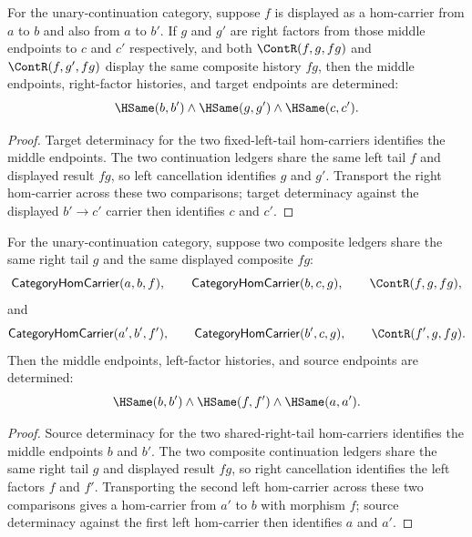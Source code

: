 \begin{theorem}
\label{thm:category-comp-same-left-tail-factorization-deterministic}
For the unary-continuation category, suppose $f$ is displayed as a hom-carrier
from $a$ to $b$ and also from $a$ to $b'$. If $g$ and $g'$ are right factors
from those middle endpoints to $c$ and $c'$ respectively, and both
$\ContR(f,g,fg)$ and $\ContR(f,g',fg)$ display the same composite history
$fg$, then the middle endpoints, right-factor histories, and target endpoints
are determined:
$$
\HSame(b,b')\wedge\HSame(g,g')\wedge\HSame(c,c').
$$
\end{theorem}
\begin{proof}
Target determinacy for the two fixed-left-tail hom-carriers identifies the
middle endpoints. The two continuation ledgers share the same left tail $f$
and displayed result $fg$, so left cancellation identifies $g$ and $g'$.
Transport the right hom-carrier across these two comparisons; target
determinacy against the displayed $b'\to c'$ carrier then identifies $c$ and
$c'$.
\end{proof}

\begin{theorem}
\label{thm:category-hom-carrier-comp-same-right-tail-factorization-deterministic}
For the unary-continuation category, suppose two composite ledgers share the
same right tail $g$ and the same displayed composite $fg$:
$$
\mathsf{CategoryHomCarrier}(a,b,f),\qquad
\mathsf{CategoryHomCarrier}(b,c,g),\qquad
\ContR(f,g,fg),
$$
and
$$
\mathsf{CategoryHomCarrier}(a',b',f'),\qquad
\mathsf{CategoryHomCarrier}(b',c,g),\qquad
\ContR(f',g,fg).
$$
Then the middle endpoints, left-factor histories, and source endpoints are
determined:
$$
\HSame(b,b')\wedge\HSame(f,f')\wedge\HSame(a,a').
$$
\end{theorem}
\begin{proof}
Source determinacy for the two shared-right-tail hom-carriers identifies the
middle endpoints $b$ and $b'$. The two composite continuation ledgers share
the same right tail $g$ and displayed result $fg$, so right cancellation
identifies the left factors $f$ and $f'$. Transporting the second left
hom-carrier across these two comparisons gives a hom-carrier from $a'$ to
$b$ with morphism $f$; source determinacy against the first left hom-carrier
then identifies $a$ and $a'$.
\end{proof}

